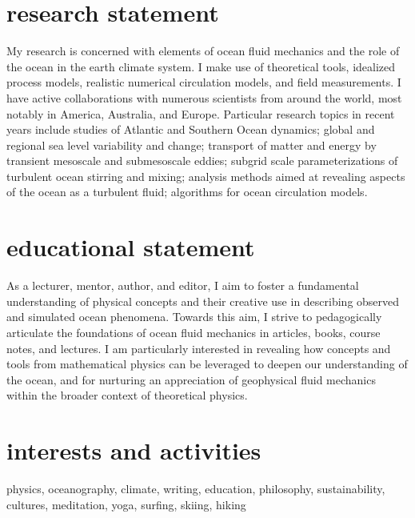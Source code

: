 \documentclass{article}
\begin{document}
\section*{\sc \color{Maroon}  research statement}
\vspace{-.3cm}
My research is concerned with elements of ocean fluid mechanics and the role of the ocean in the earth climate system. I make use of theoretical tools, idealized process models, realistic numerical circulation models, and field measurements.
I have active collaborations with numerous scientists from around the world, most notably in America, Australia, and Europe. 
Particular research topics in recent years include studies of  Atlantic and Southern Ocean dynamics; global and regional sea level variability and change;  transport of matter and energy by transient mesoscale and submesoscale eddies; subgrid scale parameterizations of turbulent ocean stirring and mixing; analysis methods aimed at revealing aspects of the ocean as a turbulent fluid; algorithms for ocean circulation models. 

\section*{\sc \color{Maroon} educational statement}
\vspace{-.3cm}
As a lecturer, mentor, author, and editor, I aim to foster a fundamental understanding of physical concepts and their creative use in describing observed and simulated ocean phenomena. Towards this aim, I strive to pedagogically articulate the foundations of ocean fluid mechanics in articles, books, course notes, and lectures.  I am particularly interested in revealing how concepts and tools from mathematical physics can be leveraged to deepen our understanding of the ocean, and for nurturing an appreciation of geophysical fluid mechanics within the broader context of theoretical physics. 

\section*{\sc  \color{Maroon}  interests and activities}
\vspace{-.25cm}

physics, oceanography, climate, writing, education, philosophy, sustainability, cultures, meditation, yoga, surfing, skiing, hiking
\end{document}
